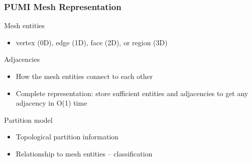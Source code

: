 \documentclass{beamer}
\begin{document}
\begin{frame}
  \frametitle{PUMI Mesh Representation}
  Mesh entities
  \begin{itemize}
    \item vertex (0D), edge (1D), face (2D), or region (3D)
  \end{itemize}
  Adjacencies
  \begin{itemize}
    \item How the mesh entities connect to each other
    \item Complete representation: store sufficient entities and adjacencies to get any adjacency in O(1) time
  \end{itemize}
  Partition model
  \begin{itemize}
    \item Topological partition information
    \item Relationship to mesh entities – classification
  \end{itemize}
  \begin{columns}
    \begin{column}{0.1\textwidth}

\end{column}
\end{columns}
\end{frame}
\end{document}
